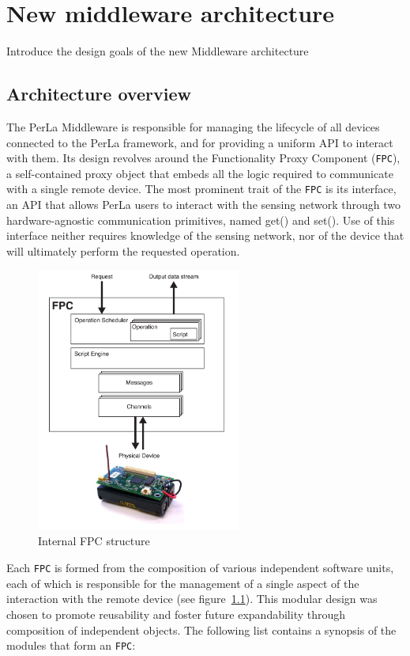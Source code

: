 \chapter{New middleware architecture}

Introduce the design goals of the new Middleware architecture

\section{Architecture overview}

The PerLa Middleware is responsible for managing the lifecycle of all devices
connected to the PerLa framework, and for providing a uniform API to interact
with them. Its design revolves around the Functionality Proxy Component
(\texttt{FPC}), a self-contained proxy object that embeds all the logic
required to communicate with a single remote device.  The most prominent trait
of the \texttt{FPC} is its interface, an API that allows PerLa users to
interact with the sensing network through two hardware-agnostic communication
primitives, named get() and set().  Use of this interface neither requires
knowledge of the sensing network, nor of the device that will ultimately
perform the requested operation.

\begin{figure}[h!]
\center
\includegraphics[width=0.6\textwidth]{imgs/fpc.pdf}
\caption{Internal FPC structure}
\label{fig:fpc_overview}
\end{figure}

Each \texttt{FPC} is formed from the composition of various independent
software units, each of which is responsible for the management of a single
aspect of the interaction with the remote device (see
figure~\ref{fig:fpc_overview}). This modular design was chosen to promote
reusability and foster future expandability through composition of
independent objects. The following list contains a synopsis of the modules
that form an \texttt{FPC}:

